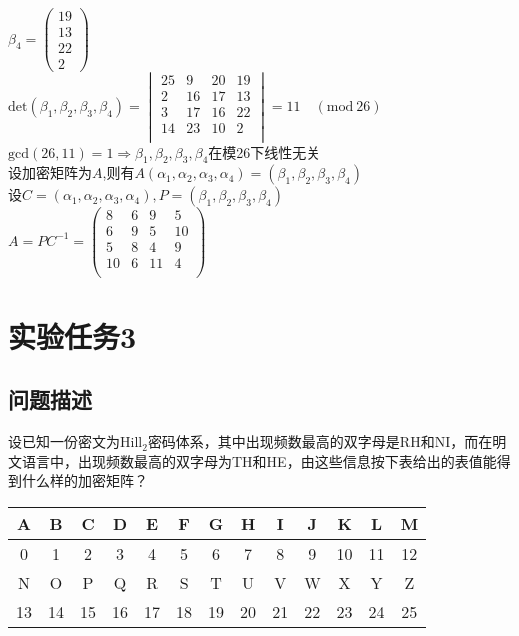 \documentclass[12pt]{article}
\begin{document}
\begin{enumerate}
$\beta_4=\begin{pmatrix}19\\13\\22\\2\end{pmatrix}$\\
$\mathrm{det}(\beta_1,\beta_2,\beta_3,\beta_4)=
\begin{vmatrix}
   25 &   9   &20&   19\\
    2  & 16  & 17 &  13\\
    3   &17 &  16  & 22\\
   14   &23&   10   & 2\\
\end{vmatrix}
=11\quad(\mathrm{mod}~26)
$\\
$\mathrm{gcd}(26,11)=1\Rightarrow\beta_1,\beta_2,\beta_3,\beta_4$在模26下线性无关\\
设加密矩阵为$A$,则有$A(\alpha_1,\alpha_2,\alpha_3,\alpha_4)=(\beta_1,\beta_2,\beta_3,\beta_4)$\\
设$C=(\alpha_1,\alpha_2,\alpha_3,\alpha_4), P=(\beta_1,\beta_2,\beta_3,\beta_4)$\\
$A=PC^{-1}=
\begin{pmatrix}
    8&    6   & 9&    5\\
    6 &   9  &  5 &  10\\
    5  &  8 &   4  &  9\\
   10   & 6&   11   & 4\\

\end{pmatrix}
$

\end{enumerate}
\section*{实验任务3}
    \subsection*{问题描述}
    设已知一份密文为Hill$_{2}$密码体系，其中出现频数最高的双字母是RH和NI，而在明文语言中，出现频数最高的双字母为TH和HE，由这些信息按下表给出的表值能得到什么样的加密矩阵？
    \begin{center}
      \begin{tabular}{|c|c|c|c|c|c|c|c|c|c|c|c|c|}
        \hline
        A & B & C & D & E & F & G & H & I & J & K & L & M \\ \hline
        0 & 1 & 2 & 3 & 4 & 5 & 6 & 7 & 8 & 9 & 10 & 11 & 12 \\ \hline \hline
        N & O & P & Q & R & S & T & U & V & W & X & Y & Z \\ \hline
        13 & 14 & 15 & 16 & 17 & 18 & 19 & 20 & 21 & 22 & 23 & 24 & 25 \\ \hline
      \end{tabular}
    \end{center}
\end{document}
